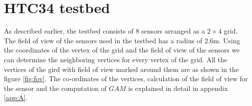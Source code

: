\section{HTC34 testbed}
As described earlier, the testbed consists of 8 sensors arranged as a $2 \times 4$ grid.
The field of view of the sensors used in the testbed has a radius of 2.6m.
Using the coordinates of the vertex of the grid and the field of view of the sensors we can determine the neighboring vertices for every vertex of the grid.
All the vertices of the gird with field of view marked around them are as shown in the figure \ref{fig:fov}. 
The co-ordinates of the vertices, calculation of the field of view for the sensor and the computation of $GAM$ is explained in detail in appendix \ref{app:A}. 




